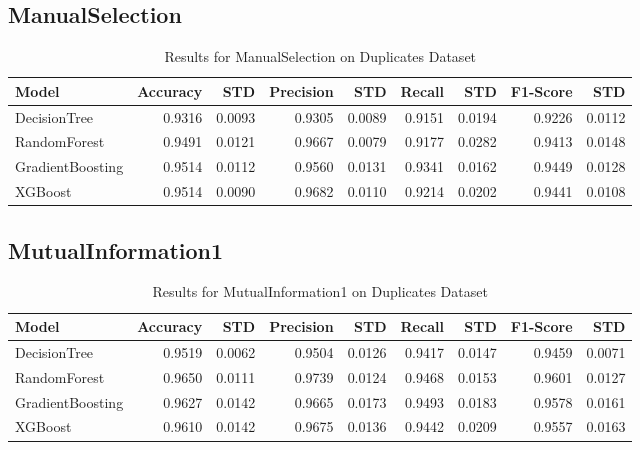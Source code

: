 \documentclass{article}
\begin{document}
\subsection{ManualSelection}
\begin{table}[h!]
\centering
\caption{Results for ManualSelection on Duplicates Dataset}
\begin{tabular}{l|rr|rr|rr|rr}
\hline
Model & Accuracy & STD & Precision & STD & Recall & STD & F1-Score & STD \\
\hline
DecisionTree & 0.9316 & 0.0093 & 0.9305 & 0.0089 & 0.9151 & 0.0194 & 0.9226 & 0.0112 \\
RandomForest & 0.9491 & 0.0121 & 0.9667 & 0.0079 & 0.9177 & 0.0282 & 0.9413 & 0.0148 \\
GradientBoosting & 0.9514 & 0.0112 & 0.9560 & 0.0131 & 0.9341 & 0.0162 & 0.9449 & 0.0128 \\
XGBoost & 0.9514 & 0.0090 & 0.9682 & 0.0110 & 0.9214 & 0.0202 & 0.9441 & 0.0108 \\
\hline
\end{tabular}
\end{table}

\subsection{MutualInformation1}
\begin{table}[h!]
\centering
\caption{Results for MutualInformation1 on Duplicates Dataset}
\begin{tabular}{l|rr|rr|rr|rr}
\hline
Model & Accuracy & STD & Precision & STD & Recall & STD & F1-Score & STD \\
\hline
DecisionTree & 0.9519 & 0.0062 & 0.9504 & 0.0126 & 0.9417 & 0.0147 & 0.9459 & 0.0071 \\
RandomForest & 0.9650 & 0.0111 & 0.9739 & 0.0124 & 0.9468 & 0.0153 & 0.9601 & 0.0127 \\
GradientBoosting & 0.9627 & 0.0142 & 0.9665 & 0.0173 & 0.9493 & 0.0183 & 0.9578 & 0.0161 \\
XGBoost & 0.9610 & 0.0142 & 0.9675 & 0.0136 & 0.9442 & 0.0209 & 0.9557 & 0.0163 \\
\hline
\end{tabular}
\end{table}
\end{document}
